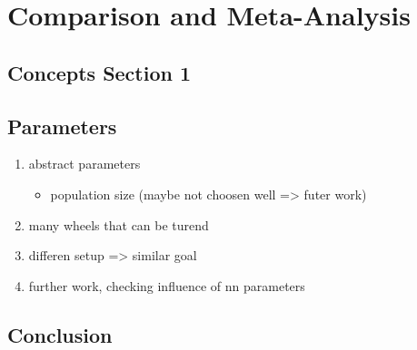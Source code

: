 

\chapter{Comparison and Meta-Analysis}
\label{sec:compare}

\section{Concepts Section 1}
\label{sec:compare:sec1}

\section{Parameters}
\begin{enumerate}
	\item abstract parameters
	\begin{itemize}
		\item population size (maybe not choosen well => futer work)
	\end{itemize}
	\item many wheels that can be turend
	\item differen setup => similar goal
	\item further work, checking influence of nn parameters

\end{enumerate}

\section{Conclusion}
\label{sec:compare:conclusion}

